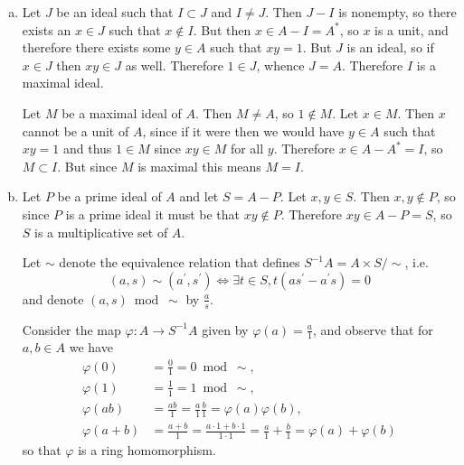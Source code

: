 \documentclass{article}
\begin{document}
\begin{Answer}
  \begin{enumerate}[(a)]
    \item{
      Let $J$ be an ideal such that $I \subset J$ and
      $I \neq J$. Then $J - I$ is nonempty, so there exists an
      $x \in J$ such that $x \notin I$. But then
      $x \in A - I = A^\ast$, so $x$ is a unit, and therefore there
      exists some $y \in A$ such that $xy = 1$. But $J$ is an ideal,
      so if $x \in J$ then $xy \in J$ as well. Therefore $1 \in J$,
      whence $J = A$. Therefore $I$ is a maximal ideal.

      Let $M$ be a maximal ideal of $A$. Then $M \neq A$, so
      $1 \notin M$. Let $x \in M$. Then $x$ cannot be a unit of $A$,
      since if it were then we would have $y \in A$ such that $xy = 1$
      and thus $1 \in M$ since $xy \in M$ for all $y$. Therefore
      $x \in A - A^\ast = I$, so $M \subset I$. But since $M$ is
      maximal this means $M = I$.
    }
    \item{
      Let $P$ be a prime ideal of $A$ and let $S = A - P$. Let
      $x, y \in S$. Then $x, y \notin P$, so since $P$ is a prime
      ideal it must be that $xy \notin P$. Therefore $xy \in A - P =
      S$, so $S$ is a multiplicative set of $A$.

      Let $\sim$ denote the equivalence relation that defines
      $S^{-1} A = A \times S / \sim$, i.e.
      $$
      (a, s) \sim (a^\prime, s^\prime)
      \iff
      \exists t \in S, t(as^\prime - a^\prime s) = 0
      $$
      and denote $(a, s) \bmod \sim$ by $\frac{a}{s}$.

      Consider the map $\varphi : A \to S^{-1} A$ given by
      $\varphi(a) = \frac{a}{1}$, and observe that for $a, b \in A$ we have
      \begin{align*}
        \varphi(0)     &= \frac{0}{1}  = 0 \bmod \sim, \\
        \varphi(1)     &= \frac{1}{1}  = 1 \bmod \sim, \\
        \varphi(ab)    &= \frac{ab}{1}
                        = \frac{a}{1}\frac{b}{1}
                        = \varphi(a)\varphi(b), \\
        \varphi(a + b) &= \frac{a + b}{1}
                        = \frac{a \cdot 1 + b \cdot 1}{1 \cdot 1}
                        = \frac{a}{1} + \frac{b}{1}
                        = \varphi(a) + \varphi(b)
      \end{align*}
      so that $\varphi$ is a ring homomorphism.

    }
  \end{enumerate}
\end{Answer}
\end{document}
